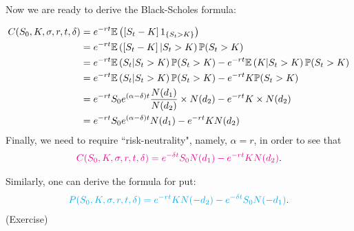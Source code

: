 \begin{frame}[fragile,t]
Now we are ready to derive the Black-Scholes formula:

\begin{align*}
	C(S_0,K,\sigma,r,t,\delta) & = e^{-rt}\mathbb{E}\left(\left[S_t-K\right]1_{\{S_t>K\}}\right)                                      \\
                             & = e^{-rt}\mathbb{E}\left(\left[S_t-K\right]|S_t>K\right)\mathbb{P}(S_t>K)                                  \\
                             & = e^{-rt}\mathbb{E}\left(S_t|S_t>K\right)\mathbb{P}(S_t>K)-e^{-rt}\mathbb{E}\left(K|S_t>K\right)\mathbb{P}(S_t>K)        \\
                             & = e^{-rt}\mathbb{E}\left(S_t|S_t>K\right)\mathbb{P}(S_t>K)-e^{-rt}K \mathbb{P}(S_t>K)                            \\
                             & = e^{-rt} S_0 e^{(\alpha-\delta)t}\frac{N(d_1)}{N(d_2)} \times N(d_2)-e^{-rt}K \times N(d_2) \\
                             & = e^{-rt} S_0 e^{(\alpha-\delta)t} N(d_1)-e^{-rt}K N(d_2)                                    \\
\end{align*}
Finally, we need to require ``risk-neutrality", namely, $\alpha=r$, in order to see that
\begin{align*}
	\textcolor{magenta}{C(S_0,K,\sigma,r,t,\delta) = e^{-\delta t} S_0 N(d_1)-e^{-rt}K N(d_2)}.
\end{align*}
\end{frame}
\begin{frame}[fragile,t]
Similarly, one can derive the formula for put:
\begin{align*}
	\textcolor{cyan}{P(S_0,K,\sigma,r,t,\delta) =e^{-rt}K N(-d_2)-e^{-\delta t} S_0 N(-d_1)}.
\end{align*}
(Exercise)
\end{frame}
